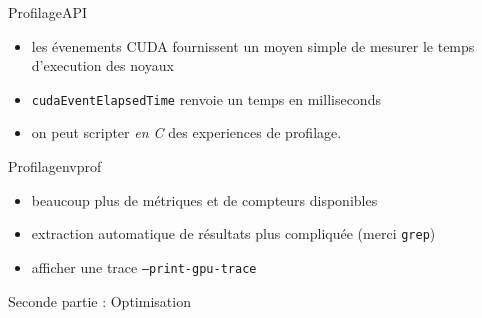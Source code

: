 \documentclass[11pt,mathserif]{beamer}
\newcommand{\argi}{\faLightbulbO}
\newcommand{\kontuz}{\faExclamationTriangle}
\newcommand{\pozik}{\faSmileO}
\newcommand{\triste}{\faFrownO}
\begin{document}
\begin{frame}{Profilage}{API}
  \begin{itemize}[<+->]
    \item[\argi] les évenements CUDA fournissent un moyen simple de mesurer le temps d'execution des noyaux
\begin{center}
  
\end{center}
   \item[\kontuz] \texttt{cudaEventElapsedTime} renvoie un temps en milliseconds
   \item[\pozik] on peut scripter {\em en C} des experiences de profilage.
  \end{itemize}
\end{frame}

\begin{frame}{Profilage}{nvprof}
  \begin{itemize}[<+->]
    \item[\pozik] beaucoup plus de métriques et de compteurs disponibles
    \item[\triste] extraction automatique de résultats plus compliquée (merci \texttt{grep})
    \item[\argi] afficher une trace {\tt --print-gpu-trace }
  \end{itemize}
\pause
\end{frame}

\begin{frame}
  \begin{center}
    {\Huge Seconde partie : Optimisation}
  \end{center}
\end{frame}
\end{document}
